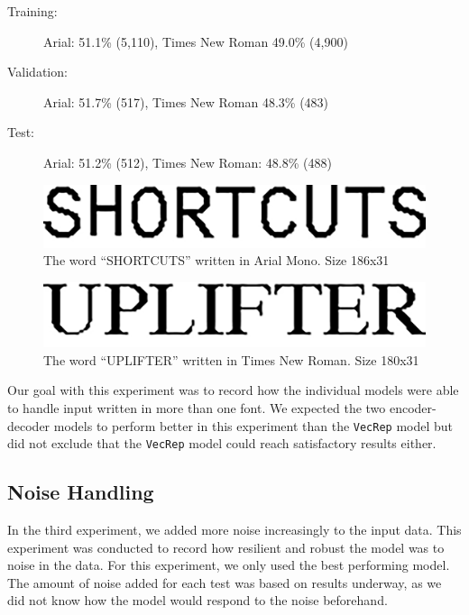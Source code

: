 \vspace{0.5cm}
\begin{minipage}{0.8\linewidth}
    \begin{description}
        \item[Training:]{Arial: 51.1\% (5,110), Times New Roman 49.0\% (4,900)}
        \item[Validation:]{Arial: 51.7\% (517), Times New Roman 48.3\% (483)}
        \item[Test:]{Arial: 51.2\% (512), Times New Roman: 48.8\% (488)}
    \end{description}
\end{minipage}

\begin{figure}[ht]
    \centering
    \captionsetup{justification=centering}
    \includegraphics[width=1\textwidth]{fig/experiments/SHORTCUTS_dpi.png}
    \caption{The word ``SHORTCUTS'' written in Arial Mono. Size 186x31}
\end{figure}

\begin{figure}[ht]
    \centering
    \captionsetup{justification=centering}
    \includegraphics[width=1\textwidth]{fig/experiments/UPLIFTER_dpi.png}
    \caption{The word ``UPLIFTER'' written in Times New Roman. Size 180x31}
\end{figure}

Our goal with this experiment was to record how the individual models were able to handle input written in more than one font. We expected the two encoder-decoder models to perform better in this experiment than the {\tt VecRep} model but did not exclude that the {\tt VecRep} model could reach satisfactory results either.

\subsection{Noise Handling}
In the third experiment, we added more noise increasingly to the input data. This experiment was conducted to record how resilient and robust the model was to noise in the data. For this experiment, we only used the best performing model. The amount of noise added for each test was based on results underway, as we did not know how the model would respond to the noise beforehand.

